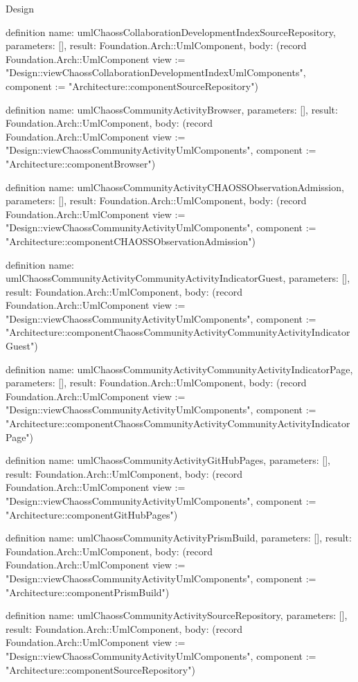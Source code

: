 \begin{lexlean}{Design}
\begin{semanticmodule}
definition{
  name: umlChaossCollaborationDevelopmentIndexSourceRepository,
  parameters: [],
  result: Foundation.Arch::UmlComponent,
  body: (record Foundation.Arch::UmlComponent {view := "Design::viewChaossCollaborationDevelopmentIndexUmlComponents", component := "Architecture::componentSourceRepository"})
}

definition{
  name: umlChaossCommunityActivityBrowser,
  parameters: [],
  result: Foundation.Arch::UmlComponent,
  body: (record Foundation.Arch::UmlComponent {view := "Design::viewChaossCommunityActivityUmlComponents", component := "Architecture::componentBrowser"})
}

definition{
  name: umlChaossCommunityActivityCHAOSSObservationAdmission,
  parameters: [],
  result: Foundation.Arch::UmlComponent,
  body: (record Foundation.Arch::UmlComponent {view := "Design::viewChaossCommunityActivityUmlComponents", component := "Architecture::componentCHAOSSObservationAdmission"})
}

definition{
  name: umlChaossCommunityActivityCommunityActivityIndicatorGuest,
  parameters: [],
  result: Foundation.Arch::UmlComponent,
  body: (record Foundation.Arch::UmlComponent {view := "Design::viewChaossCommunityActivityUmlComponents", component := "Architecture::componentChaossCommunityActivityCommunityActivityIndicatorGuest"})
}

definition{
  name: umlChaossCommunityActivityCommunityActivityIndicatorPage,
  parameters: [],
  result: Foundation.Arch::UmlComponent,
  body: (record Foundation.Arch::UmlComponent {view := "Design::viewChaossCommunityActivityUmlComponents", component := "Architecture::componentChaossCommunityActivityCommunityActivityIndicatorPage"})
}

definition{
  name: umlChaossCommunityActivityGitHubPages,
  parameters: [],
  result: Foundation.Arch::UmlComponent,
  body: (record Foundation.Arch::UmlComponent {view := "Design::viewChaossCommunityActivityUmlComponents", component := "Architecture::componentGitHubPages"})
}

definition{
  name: umlChaossCommunityActivityPrismBuild,
  parameters: [],
  result: Foundation.Arch::UmlComponent,
  body: (record Foundation.Arch::UmlComponent {view := "Design::viewChaossCommunityActivityUmlComponents", component := "Architecture::componentPrismBuild"})
}

definition{
  name: umlChaossCommunityActivitySourceRepository,
  parameters: [],
  result: Foundation.Arch::UmlComponent,
  body: (record Foundation.Arch::UmlComponent {view := "Design::viewChaossCommunityActivityUmlComponents", component := "Architecture::componentSourceRepository"})
}


\end{semanticmodule}
\end{lexlean}
